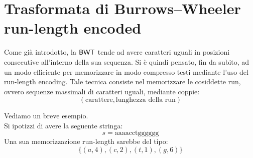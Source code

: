 \section{Trasformata di Burrows--Wheeler run-length encoded}
Come già introdotto, la $\mbox{\rm {\sf BWT}}$ tende ad avere caratteri uguali in
posizioni consecutive all'interno della sua sequenza. Si è quindi 
pensato, fin da subito, ad un modo efficiente per memorizzare in modo compresso
testi mediante l'uso del run-length encoding. Tale tecnica consiste nel
memorizzare le cosiddette run, ovvero sequenze massimali di caratteri
uguali, mediante coppie: 
\[(\mbox{carattere}, \mbox{lunghezza della run})\]
\begin{esempio}
  Vediamo un breve esempio.\\
  Si ipotizzi di avere la seguente stringa:
  \[s=\mbox{aaaacctgggggg}\]
  Una sua memorizzazione run-length sarebbe del tipo:
  \[\{(a,4),(c,2),(t,1),(g,6)\}\]
\end{esempio}
